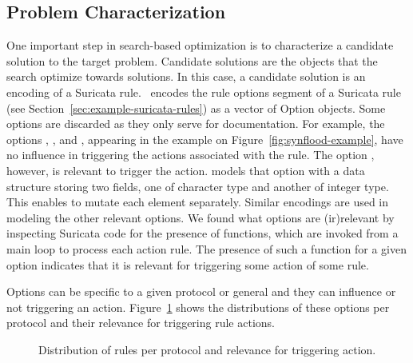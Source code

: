 \documentclass[conference]{IEEEtran}
\begin{document}
\subsection{Problem Characterization}

One important step in search-based optimization is to characterize a
candidate solution to the target problem. Candidate solutions are the
objects that the search optimize towards solutions. In this case, a 
candidate solution is an encoding of a Suricata rule.  \tname\ encodes
the rule options segment of a Suricata rule (see
Section~\ref{sec:example-suricata-rules}) as a vector of Option
objects. Some options are discarded as they only serve for
documentation. For example, the options ,
, and , appearing in the
example on Figure~\ref{fig:synflood-example}, have no influence in
triggering the actions associated with the rule. The option
, however, is relevant to trigger the action. \tname{}
models that option with a data structure storing two fields, one of
character type and another of integer type. This enables \tname{} to
mutate each element separately. Similar encodings are used in modeling
the other relevant options. We found what options are (ir)relevant by
inspecting Suricata code for the presence of  functions,
which are invoked from a main loop to process each action rule. The
presence of such a function for a given option indicates that it is
relevant for triggering some action of some rule.

Options can be specific to a given protocol or general and they can
influence or not triggering an
action. Figure~\ref{fig:distribution-rules-protocol} shows the
distributions of these options per protocol and their relevance for
triggering rule actions.

\pgfplotsset{width=5.5cm,compat=1.8}
\begin{figure}[h!]
  \centering
  \caption{\label{fig:distribution-rules-protocol}Distribution of
    rules per protocol and relevance for triggering action.}
\end{figure}
\end{document}
